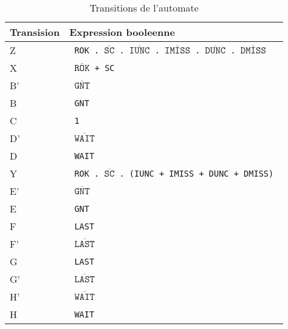 \documentclass{article}
\begin{document}
\begin{table}[H]
\centering
\begingroup
\setlength{\tabcolsep}{5pt}
\renewcommand{\arraystretch}{1.1}
\begin{tabular}{| l | l |}

\hline
Transision & Expression booleenne \\

\hline
Z
&
\texttt{
ROK . $\overline{\texttt{SC}}$ . $\overline{\texttt{IUNC}}$
. $\overline{\texttt{IMISS}}$ . $\overline{\texttt{DUNC}}$ . $\overline{\texttt{DMISS}}$
} \\

\hline


X
&
\texttt{
$\overline{\texttt{ROK}}$ + SC
} \\
\hline

B'
&
\texttt{
$\overline{\texttt{GNT}}$
} \\
\hline

B
&
\texttt{
GNT
} \\
\hline

C
&
\texttt{
1
} \\
\hline

D'
&
\texttt{
$\overline{\texttt{WAIT}}$
} \\
\hline

D
&
\texttt{
WAIT
} \\
\hline


Y
&
\texttt{
ROK . $\overline{\texttt{SC}}$ . (IUNC + IMISS + DUNC + DMISS)
} \\
\hline

E'
&
\texttt{
$\overline{\texttt{GNT}}$
} \\
\hline

E
&
\texttt{
GNT
} \\
\hline

F
&
\texttt{
LAST
} \\
\hline

F'
&
\texttt{
$\overline{\texttt{LAST}}$
} \\
\hline

G
&
\texttt{
LAST
} \\
\hline

G'
&
\texttt{
$\overline{\texttt{LAST}}$
} \\
\hline

H'
&
\texttt{
$\overline{\texttt{WAIT}}$
} \\
\hline

H
&
\texttt{
WAIT
} \\
\hline

\end{tabular}
\caption{Transitions de l'automate}
\endgroup
\end{table}
\end{document}
